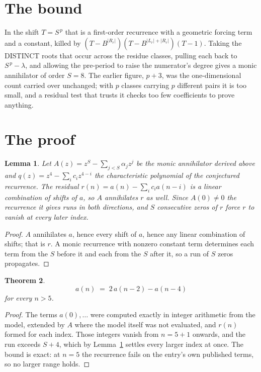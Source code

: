 \documentclass[11pt,a4paper]{article}
\theoremstyle{plain}
\newtheorem{theorem}{Theorem}
\newtheorem{lemma}[theorem]{Lemma}
\theoremstyle{definition}
\begin{document}
\section{The bound}

In the shift $T=S^{\,p}$ that is a first-order recurrence with a geometric forcing term and a
constant, killed by $(T-B^{|R_r|})(T-B^{|L_r|+|R_r|})(T-1)$. Taking the DISTINCT roots that
occur across the residue classes, pulling each back to $S^{\,p}-\lambda$, and allowing the
pre-period to raise the numerator's degree gives a monic annihilator of order $S=8$. The
earlier figure, $p+3$, was the one-dimensional count carried over unchanged; with $p$ classes
carrying $p$ different pairs it is too small, and a residual test that trusts it checks too few
coefficients to prove anything.

\section{The proof}

\begin{lemma}\label{lem:crit}
Let $A(z)=z^S-\sum_{j<S}\alpha_jz^{j}$ be the monic annihilator derived above and
$q(z)=z^{4}-\sum_ic_iz^{4-i}$ the characteristic polynomial of the conjectured
recurrence. The residual $r(n)=a(n)-\sum_ic_ia(n-i)$ is a linear combination of shifts of $a$,
so $A$ annihilates $r$ as well. Since $A(0)\ne0$ the recurrence it gives runs in both
directions, and $S$ consecutive zeros of $r$ force $r$ to vanish at every later index.
\end{lemma}

\begin{proof}
$A$ annihilates $a$, hence every shift of $a$, hence any linear combination of shifts; that is
$r$. A monic recurrence with nonzero constant term determines each term from the $S$ before it
and each from the $S$ after it, so a run of $S$ zeros propagates.
\end{proof}

\begin{theorem}
\[
a(n)\;=\;2\,a(n-2) - a(n-4)
\]
for every $n>5$.
\end{theorem}

\begin{proof}
The terms $a(0),\dots$ were computed exactly in integer arithmetic from the model, extended by
$A$ where the model itself was not evaluated, and $r(n)$ formed for each index. Those integers
vanish from $n=5+1$ onwards, and the run exceeds $S+4$, which by
Lemma~\ref{lem:crit} settles every larger index at once. The bound is exact: at $n=5$ the recurrence fails on the entry's own published terms, so no larger range holds.
\end{proof}
\end{document}
